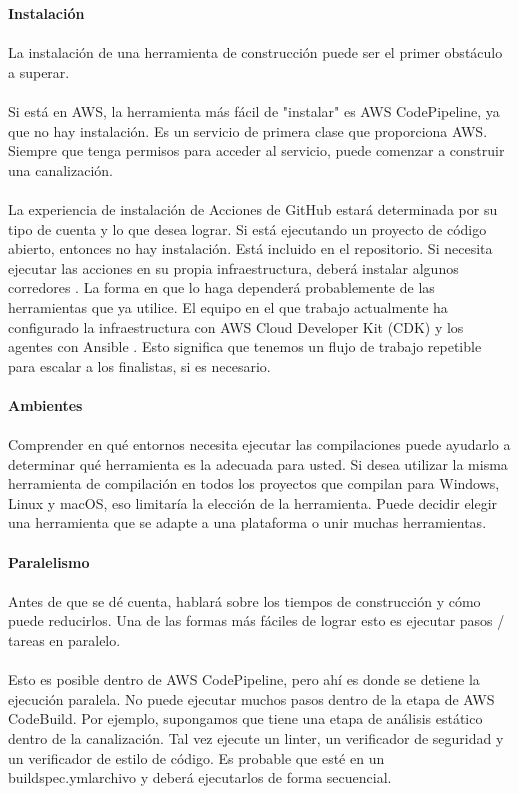 \documentclass[twoside,twocolumn]{article}
\begin{document}
\textbf{Instalación}
\\\\La instalación de una herramienta de construcción puede ser el primer obstáculo a superar.\\\\
Si está en AWS, la herramienta más fácil de "instalar" es AWS CodePipeline, ya que no hay instalación. Es un servicio de primera clase que proporciona AWS. Siempre que tenga permisos para acceder al servicio, puede comenzar a construir una canalización.\\\\
La experiencia de instalación de Acciones de GitHub estará determinada por su tipo de cuenta y lo que desea lograr. Si está ejecutando un proyecto de código abierto, entonces no hay instalación. Está incluido en el repositorio. Si necesita ejecutar las acciones en su propia infraestructura, deberá instalar algunos corredores . La forma en que lo haga dependerá probablemente de las herramientas que ya utilice. El equipo en el que trabajo actualmente ha configurado la infraestructura con AWS Cloud Developer Kit (CDK) y los agentes con Ansible . Esto significa que tenemos un flujo de trabajo repetible para escalar a los finalistas, si es necesario.
\\\\
\textbf{Ambientes}
\\\\Comprender en qué entornos necesita ejecutar las compilaciones puede ayudarlo a determinar qué herramienta es la adecuada para usted. Si desea utilizar la misma herramienta de compilación en todos los proyectos que compilan para Windows, Linux y macOS, eso limitaría la elección de la herramienta. Puede decidir elegir una herramienta que se adapte a una plataforma o unir muchas herramientas.
\\\\
\textbf{Paralelismo}
\\\\Antes de que se dé cuenta, hablará sobre los tiempos de construcción y cómo puede reducirlos. Una de las formas más fáciles de lograr esto es ejecutar pasos / tareas en paralelo.\\\\
Esto es posible dentro de AWS CodePipeline, pero ahí es donde se detiene la ejecución paralela. No puede ejecutar muchos pasos dentro de la etapa de AWS CodeBuild. Por ejemplo, supongamos que tiene una etapa de análisis estático dentro de la canalización. Tal vez ejecute un linter, un verificador de seguridad y un verificador de estilo de código. Es probable que esté en un buildspec.ymlarchivo y deberá ejecutarlos de forma secuencial.\\\\
\end{document}
